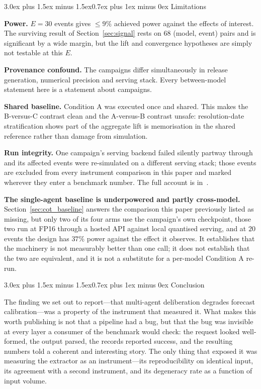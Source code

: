 \documentclass[10pt,conference]{IEEEtran}
\makeatletter
\renewcommand\section{\@startsection{section}{1}{\z@}%
  {3.0ex plus 1.5ex minus 1.5ex}{0.7ex plus 1ex minus 0ex}%
  {\normalfont\normalsize\centering\bfseries}}
\makeatother
\begin{document}
\section{Limitations}
\label{sec:limitations}

\textbf{Power.} $E = 30$ events gives $\leq 9\%$ achieved power against the effects of interest. The surviving result of Section~\ref{sec:signal} rests on $68$ (model, event) pairs and is significant by a wide margin, but the lift and convergence hypotheses are simply not testable at this $E$.

\textbf{Provenance confound.} The campaigns differ simultaneously in release generation, numerical precision and serving stack. Every between-model statement here is a statement about campaigns.

\textbf{Shared baseline.} Condition A was executed once and shared. This makes the B-versus-C contrast clean and the A-versus-B contrast unsafe: resolution-date stratification shows part of the aggregate lift is memorisation in the shared reference rather than damage from simulation.

\textbf{Run integrity.} One campaign's serving backend failed silently partway through and its affected events were re-simulated on a different serving stack; those events are excluded from every instrument comparison in this paper and marked wherever they enter a benchmark number. The full account is in~\cite{techreport}.

\textbf{The single-agent baseline is underpowered and partly cross-model.} Section~\ref{sec:cot_baseline} answers the comparison this paper previously listed as missing, but only two of its four arms use the campaign's own checkpoint, those two run at FP16 through a hosted API against local quantised serving, and at $20$ events the design has $37\%$ power against the effect it observes. It establishes that the machinery is not measurably better than one call; it does not establish that the two are equivalent, and it is not a substitute for a per-model Condition A re-run.

\section{Conclusion}
\label{sec:conclusion}

The finding we set out to report---that multi-agent deliberation degrades forecast calibration---was a property of the instrument that measured it. What makes this worth publishing is not that a pipeline had a bug, but that the bug was invisible at every layer a consumer of the benchmark would check: the request looked well-formed, the output parsed, the records reported success, and the resulting numbers told a coherent and interesting story. The only thing that exposed it was measuring the extractor as an instrument---its reproducibility on identical input, its agreement with a second instrument, and its degeneracy rate as a function of input volume.
\end{document}
